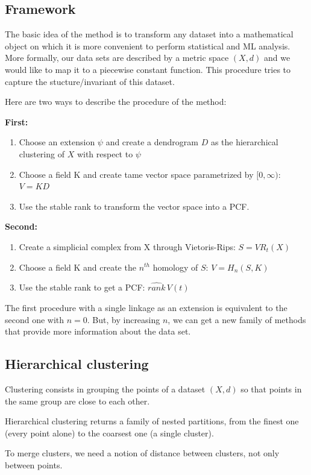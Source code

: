 \documentclass[11pt,a4paper]{article}
\begin{document}
\subsection{Framework}
The basic idea of the method is to transform any dataset into a mathematical object on which it is more convenient to perform statistical and ML analysis. More formally, our data sets are described by a metric space $(X,d)$ and we would like to map it to a piecewise constant function. This procedure tries to capture the stucture/invariant of this dataset.

Here are two ways to describe the procedure of the method:

\textbf{First:}
\begin{enumerate}
    \item Choose an extension $\psi$ and create a dendrogram $D$ as the hierarchical clustering of $X$ with respect to $\psi$
    \item Choose a field K and create tame vector space parametrized by $[0,\infty)$: $V=KD$
    \item Use the stable rank to transform the vector space into a PCF.
\end{enumerate}

\textbf{Second:}
\begin{enumerate}
    \item Create a simplicial complex from X through Vietoris-Rips: $S=VR_t(X)$
    \item Choose a field K and create the $n^{th}$ homology of $S$: $V=H_n(S,K)$
    \item Use the stable rank to get a PCF: $\widehat{rank}\,V(t)$
\end{enumerate}

The first procedure with a single linkage as an extension is equivalent to the second one with $n=0$. But, by increasing $n$, we can get a new family of methods that provide more information about the data set.


\subsection{Hierarchical clustering}
Clustering consists in grouping the points of a dataset $(X,d)$ so that points in the same group are close to each other.
 
Hierarchical clustering returns a family of nested partitions, from the finest one (every point alone) to the coarsest one (a single cluster). 

To merge clusters, we need a notion of distance between clusters, not only between points.
 
\end{document}
